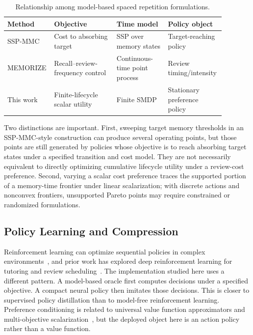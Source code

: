 \documentclass[11pt]{article}
\begin{document}
\begin{table}[h]
\centering
\small
\begin{tabular}{@{}>{\raggedright\arraybackslash}p{0.15\linewidth}>{\raggedright\arraybackslash}p{0.28\linewidth}>{\raggedright\arraybackslash}p{0.23\linewidth}>{\raggedright\arraybackslash}p{0.22\linewidth}@{}}
\toprule
Method & Objective & Time model & Policy object \\
\midrule
SSP-MMC & Cost to absorbing target & SSP over memory states & Target-reaching policy \\
MEMORIZE & Recall--review-frequency control & Continuous-time point process & Review timing/intensity \\
This work & Finite-lifecycle scalar utility & Finite SMDP & Stationary preference policy \\
\bottomrule
\end{tabular}
\caption{Relationship among model-based spaced repetition formulations.}
\label{tab:related-formulations}
\end{table}

Two distinctions are important. First, sweeping target memory thresholds in an SSP-MMC-style construction can produce several operating points, but those points are still generated by policies whose objective is to reach absorbing target states under a specified transition and cost model. They are not necessarily equivalent to directly optimizing cumulative lifecycle utility under a review-cost preference. Second, varying a scalar cost preference traces the supported portion of a memory-time frontier under linear scalarization; with discrete actions and nonconvex frontiers, unsupported Pareto points may require constrained or randomized formulations.

\subsection{Policy Learning and Compression}

Reinforcement learning can optimize sequential policies in complex environments~\citep{sutton2018reinforcement}, and prior work has explored deep reinforcement learning for tutoring and review scheduling~\citep{reddy2017accelerating,sinha2019improving}. The implementation studied here uses a different pattern. A model-based oracle first computes decisions under a specified objective. A compact neural policy then imitates those decisions. This is closer to supervised policy distillation than to model-free reinforcement learning. Preference conditioning is related to universal value function approximators and multi-objective scalarization~\citep{schaul2015universal,roijers2013survey}, but the deployed object here is an action policy rather than a value function.
\end{document}
